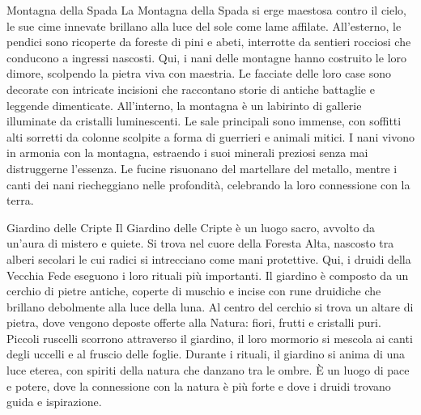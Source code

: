 \documentclass[letterpaper,twocolumn,openany,nodeprecatedcode]{dndbook}
\begin{document}
\begingroup
\DndSetThemeColor[PhbMauve]
\begin{DndComment}{Montagna della Spada}
La Montagna della Spada si erge maestosa contro il cielo, le sue cime innevate brillano alla luce del sole come lame affilate. All’esterno, le pendici sono ricoperte da foreste di pini e abeti, interrotte da sentieri rocciosi che conducono a ingressi nascosti. Qui, i nani delle montagne hanno costruito le loro dimore, scolpendo la pietra viva con maestria. Le facciate delle loro case sono decorate con intricate incisioni che raccontano storie di antiche battaglie e leggende dimenticate. All’interno, la montagna è un labirinto di gallerie illuminate da cristalli luminescenti. Le sale principali sono immense, con soffitti alti sorretti da colonne scolpite a forma di guerrieri e animali mitici. I nani vivono in armonia con la montagna, estraendo i suoi minerali preziosi senza mai distruggerne l’essenza. Le fucine risuonano del martellare del metallo, mentre i canti dei nani riecheggiano nelle profondità, celebrando la loro connessione con la terra.
\end{DndComment}

\begin{DndComment}{Giardino delle Cripte}
Il Giardino delle Cripte è un luogo sacro, avvolto da un’aura di mistero e quiete. Si trova nel cuore della Foresta Alta, nascosto tra alberi secolari le cui radici si intrecciano come mani protettive. Qui, i druidi della Vecchia Fede eseguono i loro rituali più importanti. Il giardino è composto da un cerchio di pietre antiche, coperte di muschio e incise con rune druidiche che brillano debolmente alla luce della luna. Al centro del cerchio si trova un altare di pietra, dove vengono deposte offerte alla Natura: fiori, frutti e cristalli puri. Piccoli ruscelli scorrono attraverso il giardino, il loro mormorio si mescola ai canti degli uccelli e al fruscio delle foglie. Durante i rituali, il giardino si anima di una luce eterea, con spiriti della natura che danzano tra le ombre. È un luogo di pace e potere, dove la connessione con la natura è più forte e dove i druidi trovano guida e ispirazione.
\end{DndComment}
\end{document}
